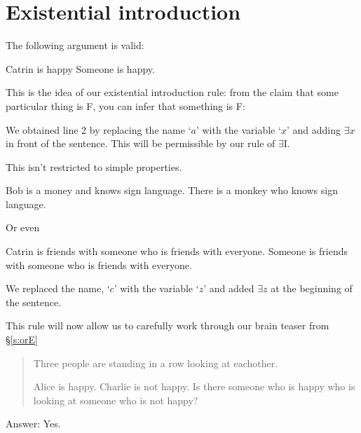 \section{Existential introduction}
The following argument is valid:
\begin{earg}
\prem Catrin is happy
\conc Someone is happy.
\end{earg}

This is the idea of our existential introduction rule: from the claim that some particular thing is F, you can infer that something is F:
\begin{pf}
	 
\end{pf}
We obtained line 2 by replacing the name `$a$' with the variable `$x$' and adding $\exists x$ in front of the sentence. This will be permissible by our rule of $\exists$I.

This isn't restricted to simple properties.
\begin{earg}
\prem Bob is a money and knows sign language.
\conc There is a monkey who knows sign language.
\end{earg}
\begin{pf}
	 
\end{pf}

Or even
\begin{earg}
\prem Catrin is friends with someone who is friends with everyone.
\conc Someone is friends with someone who is friends with everyone.
\end{earg}
\begin{pf}
	 
\end{pf}We replaced the name, `$c$' with the variable `$z$' and added $\exists z$ at the beginning of the sentence.


This rule will now allow us to carefully work through our brain teaser from \S\ref{s:orE}
\label{s:ExistsE}

\begin{quote}
Three people are standing in a row looking at eachother.
\begin{center}
\end{center}
Alice is happy. Charlie is not happy. Is there someone who is happy who is looking at someone who is not happy?
\end{quote}  Answer: Yes.

